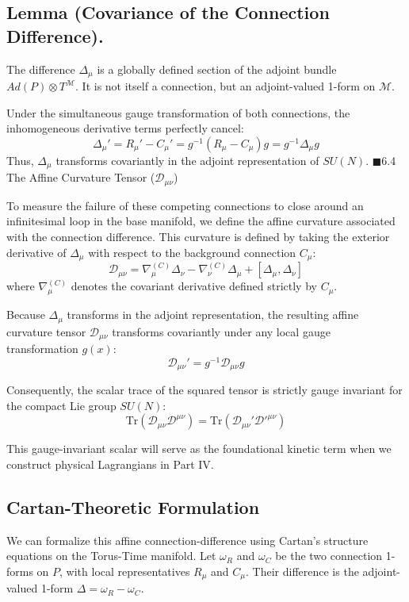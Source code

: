 \documentclass[12pt,openany]{book}
\theoremstyle{plain}
\theoremstyle{definition}
\theoremstyle{remark}
\begin{document}
\subsection{Lemma (Covariance of the Connection Difference).}
The difference $\Delta_\mu$ is a globally defined section of the adjoint bundle $Ad(P) \otimes T^\mathcal{M}$. It is not itself a connection, but an adjoint-valued 1-form on $\mathcal{M}$. 
	
Under the simultaneous gauge transformation of both connections, the inhomogeneous derivative terms perfectly cancel:$$\Delta_\mu' = R_\mu' - C_\mu' = g^{-1}(R_\mu - C_\mu)g = g^{-1}\Delta_\mu g$$Thus, $\Delta_\mu$ transforms covariantly in the adjoint representation of $SU(N)$. $\blacksquare$6.4 The Affine Curvature Tensor ($\mathcal{D}_{\mu\nu}$)
	
To measure the failure of these competing connections to close around an infinitesimal loop in the base manifold, we define the affine curvature associated with the connection difference. This curvature is defined by taking the exterior derivative of $\Delta_\mu$ with respect to the background connection $C_\mu$:
$$\mathcal{D}_{\mu\nu} = \nabla_\mu^{(C)}\Delta_\nu - \nabla_\nu^{(C)}\Delta_\mu + [\Delta_\mu, \Delta_\nu]$$where $\nabla_\mu^{(C)}$ denotes the covariant derivative defined strictly by $C_\mu$.

Because $\Delta_\mu$ transforms in the adjoint representation, the resulting affine curvature tensor $\mathcal{D}_{\mu\nu}$ transforms covariantly under any local gauge transformation $g(x)$:$$\mathcal{D}_{\mu\nu}' = g^{-1}\mathcal{D}_{\mu\nu}g$$

Consequently, the scalar trace of the squared tensor is strictly gauge invariant for the compact Lie group $SU(N)$:$$\text{Tr}(\mathcal{D}_{\mu\nu}\mathcal{D}^{\mu\nu}) = \text{Tr}(\mathcal{D}_{\mu\nu}'\mathcal{D}'^{\mu\nu})$$

This gauge-invariant scalar will serve as the foundational kinetic term when we construct physical Lagrangians in Part IV.

\subsection{Cartan-Theoretic Formulation} We can formalize this affine connection-difference using Cartan’s structure equations on the Torus-Time manifold. Let $\omega_R$ and $\omega_C$ be the two connection 1-forms on $P$, with local representatives $R_\mu$ and $C_\mu$. Their difference is the adjoint-valued 1-form $\Delta = \omega_R - \omega_C$.
\end{document}
